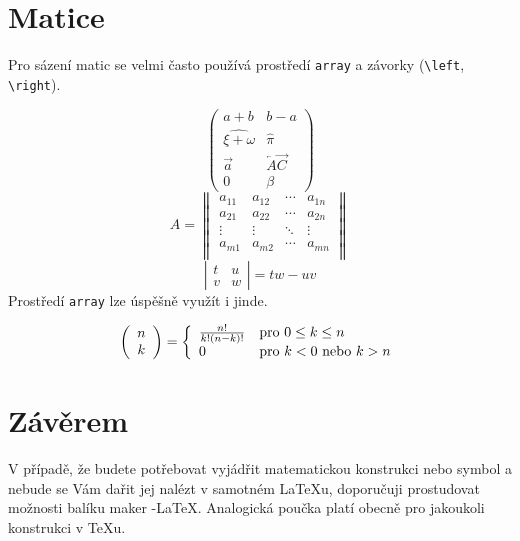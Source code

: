 \documentclass[11pt,a4paper,twocolumn]{article}
\theoremstyle{definition}
\theoremstyle{lemma}
\begin{document}
\section{Matice}
\label{matice}

\noindent Pro sázení matic se velmi často používá prostředí \texttt{array} a závorky (\verb|\left|, \verb|\right|). 

\[
  \left(
  \begin{array}{cc}
  a+b & b-a \\
  \widehat{\xi+\omega} & \hat{\pi} \\
  \vec{a} & \overleftarrow{A}\!\overrightarrow{C} \\
  0 & \beta
\end{array}
\right)
\]
\[ A = 
  \left\|
  \begin{array}{cccc}
    a_{11} & a_{12} &\cdots &a_{1n}\\
    a_{21} & a_{22} &\cdots &a_{2n}\\
    \vdots & \vdots &\ddots &\vdots\\
    a_{m1} & a_{m2} &\cdots &a_{mn}\\
  \end{array}
  \right\|
\]
\[ \left|
  \begin{array}{cc}
    t & u\\
    v & w
  \end{array}
  \right|
  =tw-uv
\]
\indent Prostředí \texttt{array} lze úspěšně využít i jinde.

\[
  \left(
  \begin{array}{c}
    n\\
    k
  \end{array}
  \right)
  = \left\{
    \begin{array}{l l}
      \frac{n!}{k!(n-k)!} & \text{pro } 0 \leq k \leq n \\
      0 & \text{pro } k < 0 \text{ nebo } k > n
    \end{array}
\right. 
  \]

\section{Závěrem}
\label{zaverem}

\noindent V případě, že budete potřebovat vyjádřit matematickou konstrukci nebo symbol a nebude
se Vám dařit jej nalézt v samotném \LaTeX u, doporučuji prostudovat možnosti balíku maker 
\AmS-\LaTeX.
Analogická poučka platí obecně pro jakoukoli konstrukci v \TeX u.
\end{document}
